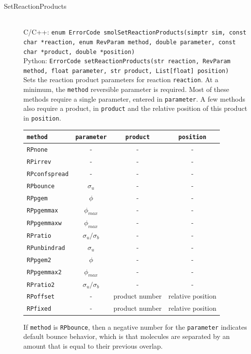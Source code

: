 \documentclass {scrbook}
\newcommand {\ttt} {\texttt}
\begin{document}
\begin{description}
\item[SetReactionProducts]
\hfill \\
C/C++: \ttt{enum ErrorCode smolSetReactionProducts(simptr sim, const char *reaction, enum RevParam method, double parameter, const char *product, double *position)}\\
Python: \ttt{ErrorCode setReactionProducts(str reaction, RevParam method, float parameter, str product, List[float] position)}\\
Sets the reaction product parameters for reaction \ttt{reaction}. At a minimum, the \ttt{method} reversible parameter is required. Most of these methods require a single parameter, entered in \ttt{parameter}. A few methods also require a product, in \ttt{product} and the relative position of this product in \ttt{position}.

\begin{longtable}[c]{lccc}
\ttt{method} & \ttt{parameter} & \ttt{product} & \ttt{position}\\
\hline
\ttt{RPnone} & - & - & -\\
\ttt{RPirrev} & - & - & -\\
\ttt{RPconfspread} & - & - & -\\
\ttt{RPbounce} & $\sigma_u$ & - & -\\
\ttt{RPpgem} & $\phi$ & - & -\\
\ttt{RPpgemmax} & $\phi_{max}$ & - & -\\
\ttt{RPpgemmaxw} & $\phi_{max}$ & - & -\\
\ttt{RPratio} & $\sigma_u/\sigma_b$ & - & -\\
\ttt{RPunbindrad} & $\sigma_u$ & - & -\\
\ttt{RPpgem2} & $\phi$ & - & -\\
\ttt{RPpgemmax2} & $\phi_{max}$ & - & -\\
\ttt{RPratio2} & $\sigma_u/\sigma_b$ & - & -\\
\ttt{RPoffset} & - & product number & relative position\\
\ttt{RPfixed} & - & product number & relative position\\
\end{longtable}

If \ttt{method} is \ttt{RPbounce}, then a negative number for the \ttt{parameter} indicates default bounce behavior, which is that molecules are separated by an amount that is equal to their previous overlap.


\end{description}
\end{document}
